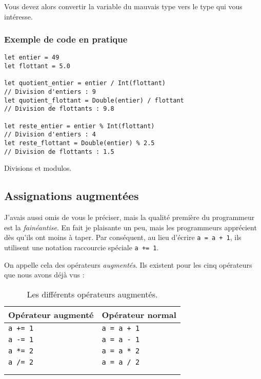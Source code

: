 Vous devez alors convertir la variable du mauvais type  vers le type qui vous intéresse.
\subsubsection{Exemple de code en pratique}





\begin{listing}[h]
\begin{verbatim}
let entier = 49
let flottant = 5.0

let quotient_entier = entier / Int(flottant)
// Division d'entiers : 9
let quotient_flottant = Double(entier) / flottant
// Division de flottants : 9.8

let reste_entier = entier % Int(flottant)
// Division d'entiers : 4
let reste_flottant = Double(entier) % 2.5
// Division de flottants : 1.5
\end{verbatim}
\caption{Divisions et modulos.}
\end{listing}

\subsection{Assignations augmentées}


J'avais aussi omis de vous le préciser, mais la qualité première du programmeur est la \emph{fainéantise}. En fait je plaisante un peu, mais les programmeurs apprécient dès qu'ils ont moins à taper.
Par conséquent, au lieu d'écrire \texttt{a = a + 1},
ils utilisent une notation raccourcie spéciale \texttt{a += 1}.

On appelle cela des opérateurs \emph{augmentés}. Ils existent pour les cinq opérateurs que nous avons déjà vus :

\newsavebox\percentboxone
{}

\newsavebox\percentboxtwo
{}


\begin{longtabu} to \linewidth {|X[,l,m]|X[,l,m]|}
\hline Opérateur augmenté & Opérateur normal \\ \hline
\endhead
\texttt{a += 1} & \texttt{a = a + 1} \\ \hline
\texttt{a -= 1} & \texttt{a = a - 1} \\ \hline
\texttt{a *= 2} & \texttt{a = a * 2} \\ \hline
\texttt{a /= 2} & \texttt{a = a / 2} \\ \hline
\usebox{\percentboxone} & \usebox{\percentboxtwo} \\ \hline
\caption{Les différents opérateurs augmentés.}
\end{longtabu}

